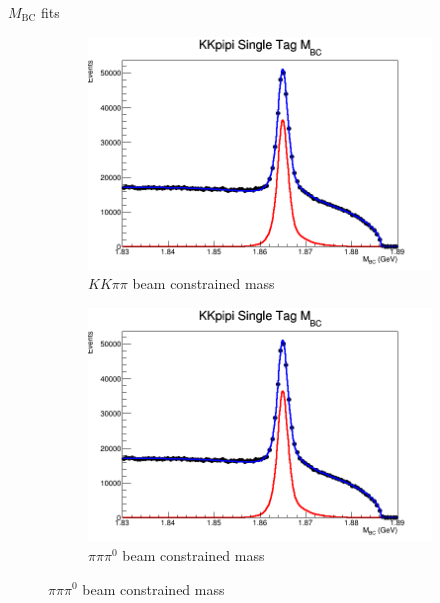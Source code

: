 \documentclass{beamer}
\begin{document}
\begin{frame}{$M_\text{BC}$ fits}
  \begin{figure}
    \centering
    \vspace{-0.2cm}
    \begin{subfigure}{0.5\textwidth}
      \includegraphics[width = 1\textwidth]{KKpipiMBCFit.png}
      \caption{$KK\pi\pi$ beam constrained mass}
    \end{subfigure}%
    \begin{subfigure}{0.5\textwidth}
      \includegraphics[width = 1\textwidth]{KKpipiMBCFit.png}
      \caption{$\pi\pi\pi^0$ beam constrained mass}
    \end{subfigure}
  \end{figure}
\end{frame}
\end{document}
